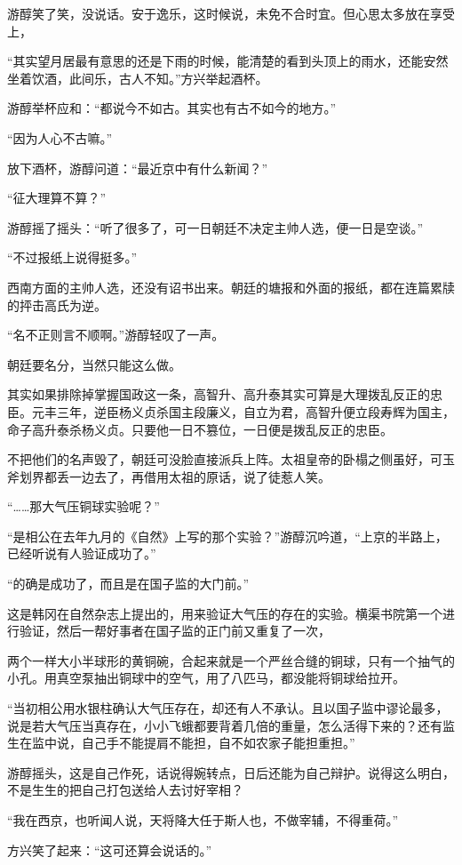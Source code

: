 游醇笑了笑，没说话。安于逸乐，这时候说，未免不合时宜。但心思太多放在享受上，

“其实望月居最有意思的还是下雨的时候，能清楚的看到头顶上的雨水，还能安然坐着饮酒，此间乐，古人不知。”方兴举起酒杯。

游醇举杯应和：“都说今不如古。其实也有古不如今的地方。”

“因为人心不古嘛。”

放下酒杯，游醇问道：“最近京中有什么新闻？”

“征大理算不算？”

游醇摇了摇头：“听了很多了，可一日朝廷不决定主帅人选，便一日是空谈。”

“不过报纸上说得挺多。”

西南方面的主帅人选，还没有诏书出来。朝廷的塘报和外面的报纸，都在连篇累牍的抨击高氏为逆。

“名不正则言不顺啊。”游醇轻叹了一声。

朝廷要名分，当然只能这么做。

其实如果排除掉掌握国政这一条，高智升、高升泰其实可算是大理拨乱反正的忠臣。元丰三年，逆臣杨义贞杀国主段廉义，自立为君，高智升便立段寿辉为国主，命子高升泰杀杨义贞。只要他一日不篡位，一日便是拨乱反正的忠臣。

不把他们的名声毁了，朝廷可没脸直接派兵上阵。太祖皇帝的卧榻之侧虽好，可玉斧划界都丢一边去了，再借用太祖的原话，说了徒惹人笑。

“……那大气压铜球实验呢？”

“是相公在去年九月的《自然》上写的那个实验？”游醇沉吟道，“上京的半路上，已经听说有人验证成功了。”

“的确是成功了，而且是在国子监的大门前。”

这是韩冈在自然杂志上提出的，用来验证大气压的存在的实验。横渠书院第一个进行验证，然后一帮好事者在国子监的正门前又重复了一次，

两个一样大小半球形的黄铜碗，合起来就是一个严丝合缝的铜球，只有一个抽气的小孔。用真空泵抽出铜球中的空气，用了八匹马，都没能将铜球给拉开。

“当初相公用水银柱确认大气压存在，却还有人不承认。且以国子监中谬论最多，说是若大气压当真存在，小小飞蛾都要背着几倍的重量，怎么活得下来的？还有监生在监中说，自己手不能提肩不能担，自不如农家子能担重担。”

游醇摇头，这是自己作死，话说得婉转点，日后还能为自己辩护。说得这么明白，不是生生的把自己打包送给人去讨好宰相？

“我在西京，也听闻人说，天将降大任于斯人也，不做宰辅，不得重荷。”

方兴笑了起来：“这可还算会说话的。”

